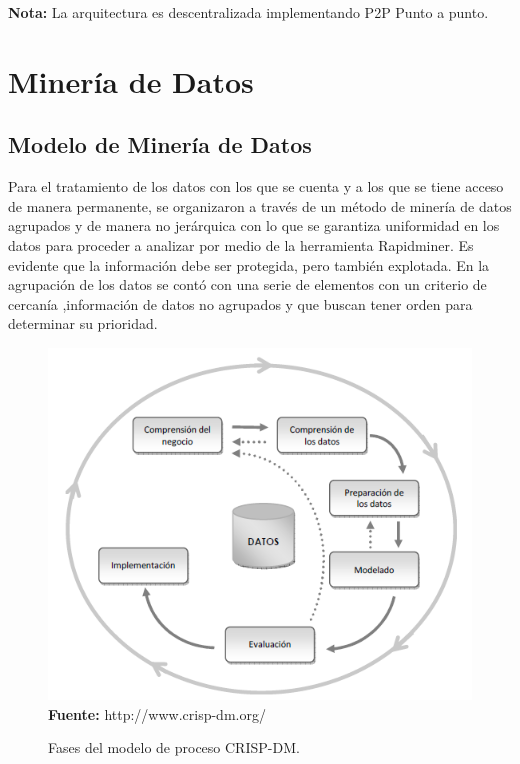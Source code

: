\documentclass[a4paper,openright,12pt]{book}
\theoremstyle{definition}
\theoremstyle{remark}
\begin{document}
\textbf{Nota:} La arquitectura es descentralizada implementando P2P Punto a punto.
   
\section{Minería de Datos}

\subsection{Modelo de Minería de Datos}

Para el tratamiento de los datos con los que se cuenta y a los que se tiene acceso de manera permanente, se organizaron a través de un método de minería de datos agrupados y de manera no jerárquica con lo que se garantiza uniformidad en los datos para proceder a analizar por medio de la herramienta Rapidminer. Es evidente que la información debe ser protegida, pero también explotada. En la agrupación de los datos se contó con una serie de elementos  con un criterio de cercanía ,información de datos no agrupados y que buscan tener orden  para determinar su prioridad.

\begin{figure}[ht]
\centering
\caption{Fases del modelo de proceso CRISP-DM.} 
\includegraphics[scale=0.50]{CRIPS}
\\\textbf{Fuente:} http://www.crisp-dm.org/
\label{fig:Ubicacion}
\end{figure}
\end{document}
